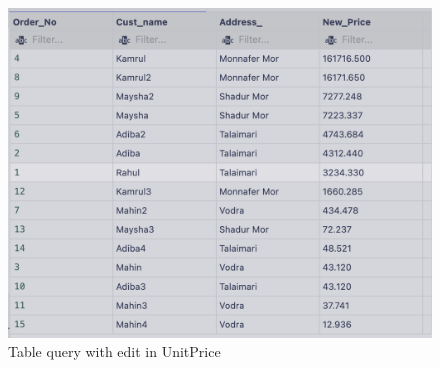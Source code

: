 \documentclass[12pt]{article}
\begin{document}
\begin{figure}[!ht]
    \centering
    \includegraphics[width=\textwidth]{images/4query.png}
    \caption{Table query with edit in UnitPrice}
    \label{fig:query}
\end{figure}

% 
% 
\end{document}
